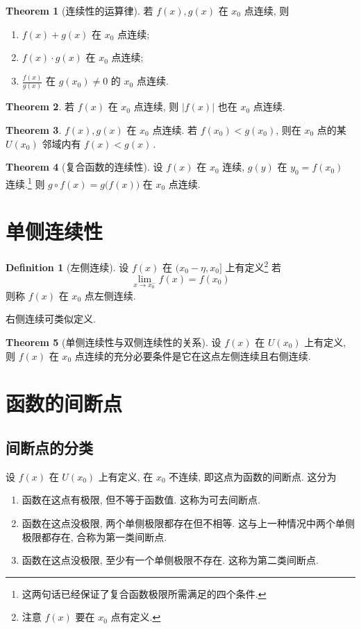 \documentclass{book}
\newcommand{\compose}{\circ}
\newcommand{\abs}[1]{\left\lvert #1 \right\rvert}
\renewcommand{\U}[1]{U\!\left( #1 \right)}%
\numberwithin{equation}{section}
\numberwithin{figure}{section}
\theoremstyle{definition}
\newtheorem{definition}{Definition}
\newtheorem{theorem}{Theorem}[section]
\begin{document}
\begin{theorem}[连续性的运算律]
  若 $f(x),g(x)$ 在 $x_0$ 点连续, 则
  \begin{enumerate}
    \item $f(x)+g(x)$ 在 $x_0$ 点连续;
    \item $f(x)\cdot g(x)$ 在 $x_0$ 点连续;
    \item $\frac{f(x)}{g(x)}$ 在 $g(x_0)\ne0$ 的 $x_0$ 点连续.
  \end{enumerate}
\end{theorem}

\begin{theorem}
  若 $f(x)$ 在 $x_0$ 点连续, 则 $\abs{f(x)}$ 也在 $x_0$ 点连续.
\end{theorem}

\begin{theorem}
  $f(x),g(x)$ 在 $x_0$ 点连续. 若 $f(x_0)<g(x_0)$, 则在 $x_0$ 点的某 $\U{x_0}$ 邻域内有 $f(x)<g(x)$\,.
\end{theorem}

\begin{theorem}[复合函数的连续性]
  设 $f(x)$ 在 $x_0$ 连续, $g(y)$ 在 $y_0=f(x_0)$ 连续.\footnote{这两句话已经保证了复合函数极限所需满足的四个条件.} 则 $g\compose f(x)=g\big( f(x) \big)$ 在 $x_0$ 点连续.
\end{theorem}
\section{单侧连续性}
\begin{definition}[左侧连续]
设 $f(x)$ 在 $(x_0-\eta,x_0]$ 上有定义\footnote{注意 $f(x)$ 要在 $x_0$ 点有定义.}
若
\begin{equation*}
  \lim_{x\to x_0^-}f(x)=f(x_0)
\end{equation*}
则称 $f(x)$ 在 $x_0$ 点左侧连续.
\end{definition}
右侧连续可类似定义.

\begin{theorem}[单侧连续性与双侧连续性的关系]
  设 $f(x)$ 在 $\U{x_0}$ 上有定义, 则 $f(x)$ 在 $x_0$ 点连续的充分必要条件是它在这点左侧连续且右侧连续.
\end{theorem}
%
\section{函数的间断点}
\subsection{间断点的分类}
设 $f(x)$ 在 $\U{x_0}$ 上有定义, 在 $x_0$ 不连续, 即这点为函数的间断点.
这分为
\begin{enumerate}
  \item 函数在这点有极限, 但不等于函数值. 这称为可去间断点.
  \item 函数在这点没极限, 两个单侧极限都存在但不相等. 这与上一种情况中两个单侧极限都存在, 合称为第一类间断点.
  \item 函数在这点没极限, 至少有一个单侧极限不存在. 这称为第二类间断点.
\end{enumerate}
\end{document}
